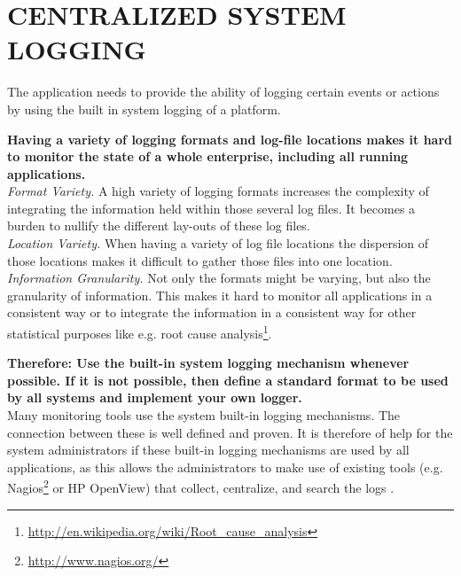 \newpage
\section*{CENTRALIZED SYSTEM LOGGING}

The application needs to provide the ability of logging certain events or actions by using the built in system logging of a platform. 

\begin{center}
  
\end{center}

\textbf{Having a variety of logging formats and log-file locations makes it hard to monitor the state of a whole enterprise, including all running applications.}\\

\textit{Format Variety.} A high variety of logging formats increases the complexity of integrating the information held within those several log files. It becomes a burden to nullify the different lay-outs of these log files.\\ 

\textit{Location Variety.} When having a variety of log file locations the dispersion of those locations makes it difficult to gather those files into one location.\\

\textit{Information Granularity.} Not only the formats might be varying, but also the granularity of information. This makes it hard to monitor all applications in a consistent way or to integrate the information in a consistent way for other statistical purposes like e.g. root cause analysis\footnote{\url{http://en.wikipedia.org/wiki/Root_cause_analysis}}.

\begin{center}
   
\end{center}

\textbf{Therefore: Use the built-in system logging mechanism whenever possible. If it is not possible, then define a standard format to be used by all systems and implement your own logger.}\\

Many monitoring tools use the system built-in logging mechanisms. The connection between these is well defined and proven. It is therefore of help for the system administrators if these built-in logging mechanisms are used by all applications, as this allows the administrators to make use of existing tools (e.g. Nagios\footnote{\url{http://www.nagios.org/}} or HP OpenView) that collect, centralize, and search the logs \cite{Limoncelli2011a}.

